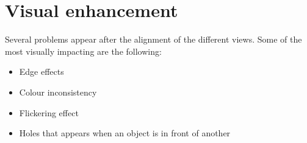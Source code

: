 \section{Visual enhancement}
\label{section:Visual enhancement}

Several problems appear after the alignment of the different views. Some of the most visually impacting are the following:

\begin{itemize}
    \item Edge effects
    \item Colour inconsistency
    \item Flickering effect
    \item Holes that appears when an object is in front of another
\end{itemize}




